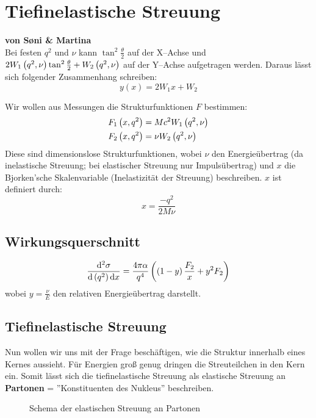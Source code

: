 \documentclass[Ex4_Zusammenfassung.tex]{subfiles}
\begin{document}
\section{Tiefinelastische Streuung}
\textbf{von S\o{}ni \& Martina}\\

Bei festen $q^2$ und $\nu$ kann $\tan^2 \frac{\theta}{2}$ auf der X--Achse und $2W_1\left( q^2,\nu\right) \tan^2 \frac{\theta}{2} + W_2\left( q^2,\nu\right)$ auf der Y--Achse aufgetragen werden. Daraus lässt sich folgender Zusammenhang schreiben:
\begin{equation}
	y(x) = 2W_1x+W_2
\end{equation}

Wir wollen aus Messungen die Strukturfunktionen $F$ bestimmen:
\begin{align}
	F_1\left( x,q^2\right) &= Mc^2 W_1\left( q^2,\nu\right)\\
	F_2\left( x,q^2\right) &= \nu W_2\left( q^2,\nu\right)
\end{align}
Diese sind dimensionslose Strukturfunktionen, wobei $\nu$ den Energieübertrag (da inelastische Streuung; bei elastischer Streuung nur Impulsübertrag) und $x$ die Bjorken'sche Skalenvariable (Inelastizität der Streuung) beschreiben. $x$ ist definiert durch:
\begin{equation}
	x = \frac{-q^2}{2M\nu}
\end{equation}

\subsection*{Wirkungsquerschnitt}
\begin{equation}
	\frac{\mathrm{d} ^2 \sigma}{\mathrm{d} \left( q^2\right) \mathrm{d} x} = \frac{4\pi \alpha}{q^4} \left( \left( 1-y\right) \frac{F_2}{x} + y^2 F_2\right)
\end{equation}
wobei $y=\frac{\nu}{E}$ den relativen Energieübertrag darstellt.
\pagebreak
\subsection*{Tiefinelastische Streuung}
Nun wollen wir uns mit der Frage beschäftigen, wie die Struktur innerhalb eines Kernes aussieht. Für Energien groß genug dringen die Streuteilchen in den Kern ein. Somit lässt sich die tiefinelastische Streuung als elastische Streuung an \textbf{Partonen} = ''Konstituenten des Nukleus'' beschreiben.
\begin{figure}[H]
	\centering
	\caption{Schema der elastischen Streuung an Partonen}
\end{figure}
\end{document}

